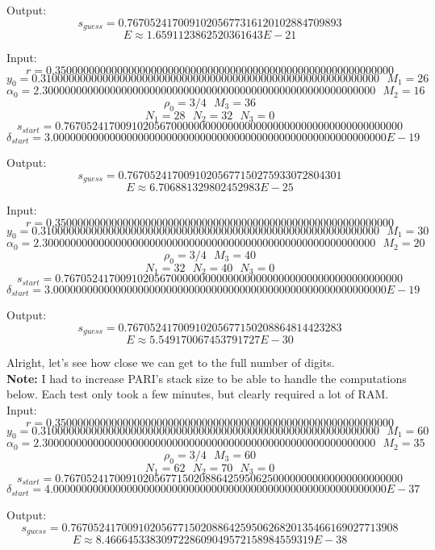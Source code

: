 \documentclass[]{article}
\begin{document}
Output:
$$
s_{guess} = 0.76705241700910205677316120102884709893 $$$$
E \approx 1.6591123862520361643 E-21
$$

Input:
$$
r = 0.350000000000000000000000000000000000000000000000000000000000 $$$$
y_0 = 0.310000000000000000000000000000000000000000000000000000000000 ~~~ M_1 = 26 $$$$
\alpha_0 = 2.30000000000000000000000000000000000000000000000000000000000 ~~~ M_2 = 16 $$$$
\rho_0 = 3/4 ~~~ M_3 = 36 $$$$
N_1 = 28 ~~~ N_2 = 32 ~~~ N_3 = 0 $$$$
s_{start} = 0.767052417009102056700000000000000000000000000000000000000000 $$$$
\delta_{start} = 3.00000000000000000000000000000000000000000000000000000000000 E-19
$$

Output:
$$
s_{guess} = 0.76705241700910205677150275933072804301 $$$$
E \approx 6.706881329802452983 E-25
$$

Input:
$$
r = 0.350000000000000000000000000000000000000000000000000000000000 $$$$
y_0 = 0.310000000000000000000000000000000000000000000000000000000000 ~~~ M_1 = 30 $$$$
\alpha_0 = 2.30000000000000000000000000000000000000000000000000000000000 ~~~ M_2 = 20 $$$$
\rho_0 = 3/4 ~~~ M_3 = 40 $$$$
N_1 = 32 ~~~ N_2 = 40 ~~~ N_3 = 0 $$$$
s_{start} = 0.767052417009102056700000000000000000000000000000000000000000 $$$$
\delta_{start} = 3.00000000000000000000000000000000000000000000000000000000000 E-19
$$

Output:
$$
s_{guess} = 0.76705241700910205677150208864814423283 $$$$
E \approx 5.549170067453791727 E-30
$$

Alright, let's see how close we can get to the full number of digits.
\\

\textbf{Note:} I had to increase PARI's stack size to be able to handle the computations below. Each test only took a few minutes, but clearly required a lot of RAM.
\\

Input:
$$
r = 0.350000000000000000000000000000000000000000000000000000000000 $$$$
y_0 = 0.310000000000000000000000000000000000000000000000000000000000 ~~~ M_1 = 60 $$$$
\alpha_0 = 2.30000000000000000000000000000000000000000000000000000000000 ~~~ M_2 = 35 $$$$
\rho_0 = 3/4 ~~~ M_3 = 60 $$$$
N_1 = 62 ~~~ N_2 = 70 ~~~ N_3 = 0 $$$$
s_{start} = 0.767052417009102056771502088642595062500000000000000000000000 $$$$
\delta_{start} = 4.00000000000000000000000000000000000000000000000000000000000 E-37
$$

Output:
$$
s_{guess} = 0.7670524170091020567715020886425950626820135466169027713908 $$$$
E \approx 8.4666453383097228609049572158984559319 E-38
$$
\end{document}
